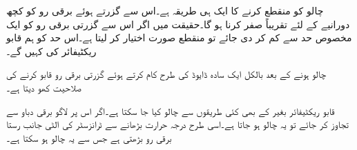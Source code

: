 چالو  کو منقطع کرنے کا ایک ہی طریقہ ہے۔اس سے گزرتے ہوئے برقی رو کو کچھ دورانیے کے لئے تقریباً صفر کرنا ہو گا۔حقیقت میں اگر اس سے گزرتی برقی رو کو  ایک مخصوص حد  سے کم کر دی جائے تو  منقطع صورت اختیار کر لیتا ہے۔اس حد کو ہم قابو ریکٹیفائر کی  کہیں گے۔

چالو ہونے کے بعد  بالکل ایک سادہ ڈایوڈ کی طرح کام کرتے ہوئے  گزرتی برقی رو قابو کرنے کی صلاحیت کھو دیتا ہے۔

قابو ریکٹیفائر بغیر  کے بھی کئی طریقوں سے چالو کیا جا سکتا ہے۔اگر اس پر لاگو برقی دباو  سے تجاوز کر جائے تو یہ چالو ہو جاتا ہے۔اسی طرح درجہ حرارت بڑھانے سے ٹرانزسٹر کی الٹی جانب رستا برقی رو بڑھتی ہے جس سے یہ چالو ہو سکتا ہے۔

